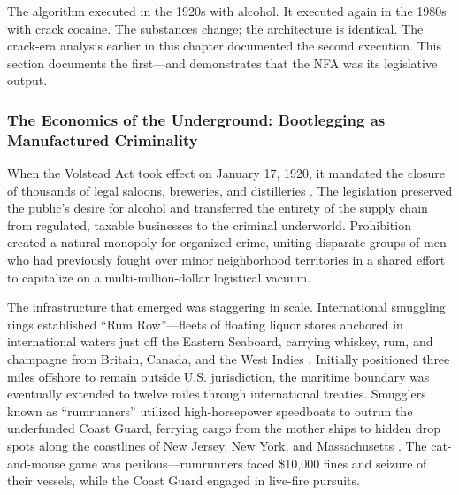 The algorithm executed in the 1920s with alcohol. It executed again in the 1980s with crack cocaine. The substances change; the architecture is identical. The crack-era analysis earlier in this chapter documented the second execution. This section documents the first---and demonstrates that the NFA was its legislative output.

\subsubsection{The Economics of the Underground: Bootlegging as Manufactured Criminality}

When the Volstead Act took effect on January 17, 1920, it mandated the closure of thousands of legal saloons, breweries, and distilleries \cite{archives_smugglers}. The legislation preserved the public's desire for alcohol and transferred the entirety of the supply chain from regulated, taxable businesses to the criminal underworld. Prohibition created a natural monopoly for organized crime, uniting disparate groups of men who had previously fought over minor neighborhood territories in a shared effort to capitalize on a multi-million-dollar logistical vacuum.

The infrastructure that emerged was staggering in scale. International smuggling rings established ``Rum Row''---fleets of floating liquor stores anchored in international waters just off the Eastern Seaboard, carrying whiskey, rum, and champagne from Britain, Canada, and the West Indies \cite{archives_smugglers, coastguard_rumrow}. Initially positioned three miles offshore to remain outside U.S. jurisdiction, the maritime boundary was eventually extended to twelve miles through international treaties. Smugglers known as ``rumrunners'' utilized high-horsepower speedboats to outrun the underfunded Coast Guard, ferrying cargo from the mother ships to hidden drop spots along the coastlines of New Jersey, New York, and Massachusetts \cite{capecod_rumrunners, ipswich_rumrunners}. The cat-and-mouse game was perilous---rumrunners faced \$10,000 fines and seizure of their vessels, while the Coast Guard engaged in live-fire pursuits.

